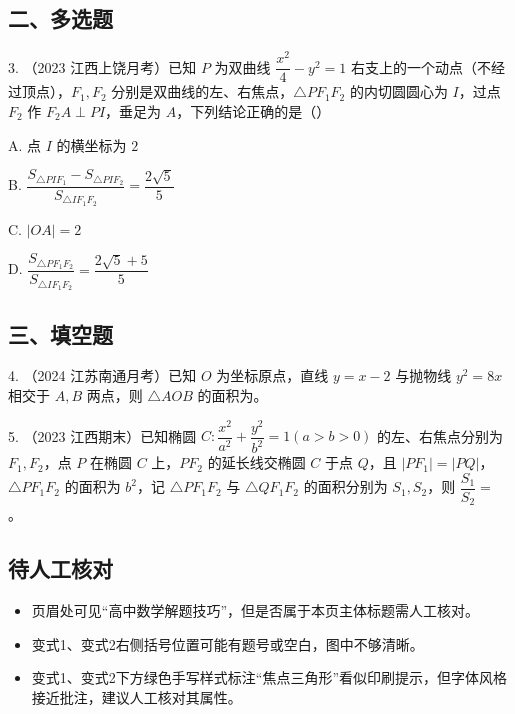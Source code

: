 \documentclass[UTF8,a4paper,11pt]{ctexart}
\begin{document}
\subsection*{二、多选题}

3. （2023 江西上饶月考）已知 $P$ 为双曲线 $\dfrac{x^2}{4}-y^2=1$ 右支上的一个动点（不经过顶点），$F_1,F_2$ 分别是双曲线的左、右焦点，$\triangle PF_1F_2$ 的内切圆圆心为 $I$，过点 $F_2$ 作 $F_2A\perp PI$，垂足为 $A$，下列结论正确的是（\hspace{1cm}）

A. 点 $I$ 的横坐标为 $2$

B. $\dfrac{S_{\triangle PIF_1}-S_{\triangle PIF_2}}{S_{\triangle IF_1F_2}}=\dfrac{2\sqrt{5}}{5}$

C. $|OA|=2$

D. $\dfrac{S_{\triangle PF_1F_2}}{S_{\triangle IF_1F_2}}=\dfrac{2\sqrt{5}+5}{5}$

\subsection*{三、填空题}

4. （2024 江苏南通月考）已知 $O$ 为坐标原点，直线 $y=x-2$ 与抛物线 $y^2=8x$ 相交于 $A,B$ 两点，则 $\triangle AOB$ 的面积为\underline{\hspace{2cm}}。

5. （2023 江西期末）已知椭圆 $C:\dfrac{x^2}{a^2}+\dfrac{y^2}{b^2}=1(a>b>0)$ 的左、右焦点分别为 $F_1,F_2$，点 $P$ 在椭圆 $C$ 上，$PF_2$ 的延长线交椭圆 $C$ 于点 $Q$，且 $|PF_1|=|PQ|$，$\triangle PF_1F_2$ 的面积为 $b^2$，记 $\triangle PF_1F_2$ 与 $\triangle QF_1F_2$ 的面积分别为 $S_1,S_2$，则 $\dfrac{S_1}{S_2}=$ \underline{\hspace{2cm}}。

\subsection*{待人工核对}

\begin{itemize}

\item 页眉处可见“高中数学解题技巧”，但是否属于本页主体标题需人工核对。

\item 变式1、变式2右侧括号位置可能有题号或空白，图中不够清晰。

\item 变式1、变式2下方绿色手写样式标注“焦点三角形”看似印刷提示，但字体风格接近批注，建议人工核对其属性。

\end{itemize}
\end{document}
